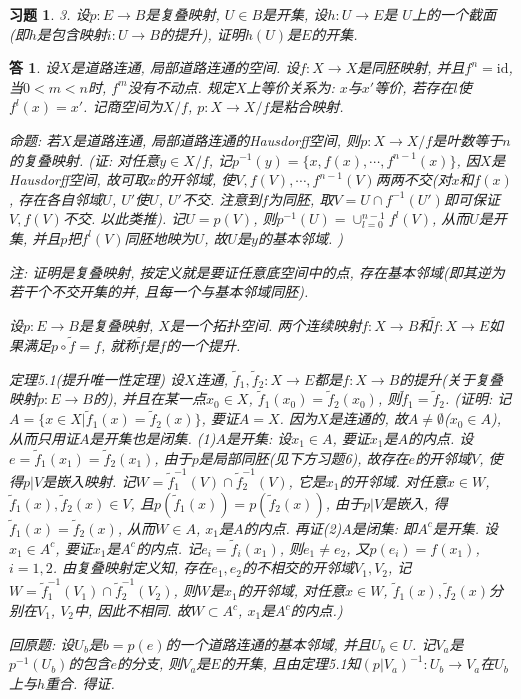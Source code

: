 \documentclass{ctexart}%
\newtheorem*{exercise}{习题}
\newtheorem*{solution}{答}
\theoremstyle{definition}
\theoremstyle{remark}
\begin{document}
\begin{exercise}3. 设$p:E\rightarrow B$是复叠映射, $U\in B$是开集, 设$h:U\rightarrow E$是 $U$上的一个截面(即$h$是包含映射$i:U\rightarrow B$的提升), 证明$h(U)$是$E$的开集. 
\end{exercise}
\begin{solution}
设$X$是道路连通, 局部道路连通的空间. 设$f:X\rightarrow X$是同胚映射, 并且$f^n=\text{id}$, 当$0<m<n$时, $f^m$没有不动点. 规定$X$上等价关系为: $x$与$x'$等价, 若存在$l$使$f^l(x)=x'$. 记商空间为$X/f$, $p:X\rightarrow X/f$是粘合映射. 

命题: 若$X$是道路连通, 局部道路连通的Hausdorff空间, 则$p:X\rightarrow X/f$是叶数等于$n$的复叠映射. (证: 对任意$y\in X/f$, 记$p^{-1}(y)=\{x,f(x),\cdots, f^{n-1}(x)\}$, 因$X$是Hausdorff空间, 故可取$x$的开邻域, 使$V,f(V),\cdots, f^{n-1}(V)$两两不交(对$x$和$f(x)$, 存在各自邻域$U$, $U'$使$U$, $U'$不交. 注意到$f$为同胚, 取$V=U\cap f^{-1}(U')$即可保证$V, f(V)$不交. 以此类推). 记$U=p(V)$, 则$p^{-1}(U)=\cup^{n-1}_{l=0}f^l(V)$, 从而$U$是开集, 并且$p$把$f^l(V)$同胚地映为$U$, 故$U$是$y$的基本邻域. )

注: 证明是复叠映射, 按定义就是要证任意底空间中的点, 存在基本邻域(即其逆为若干个不交开集的并, 且每一个与基本邻域同胚).


设$p:E\rightarrow B$是复叠映射, $X$是一个拓扑空间. 两个连续映射$f:X\rightarrow B$和$\tilde{f}:X\rightarrow E$如果满足$p\circ \tilde{f}= f$, 就称$\tilde{f}$是$f$的一个提升. 

定理5.1(提升唯一性定理) 设$X$连通, $\tilde{f}_1,\tilde{f}_2:X\rightarrow E$都是$f:X\rightarrow B$的提升(关于复叠映射$p:E\rightarrow B$的), 并且在某一点$x_0\in X$, $\tilde{f}_1(x_0)=\tilde{f}_2(x_0)$, 则$\tilde{f}_1=\tilde{f}_2$.  (证明: 记$A=\{x\in X|\tilde{f}_1(x)=\tilde{f}_2(x)\}$, 要证$A=X$. 因为$X$是连通的, 故$A\neq \emptyset$($x_0\in A$), 从而只用证$A$是开集也是闭集. (1)$A$是开集: 设$x_1\in A$, 要证$x_1$是$A$的内点. 设$e=\tilde{f}_1(x_1)=\tilde{f}_2(x_1)$, 由于$p$是局部同胚(见下方习题6), 故存在$e$的开邻域$V$, 使得$p|V$是嵌入映射. 记$W=\tilde{f}_1^{-1}(V)\cap\tilde{f}_2^{-1}(V)$, 它是$x_1$的开邻域. 对任意$x\in W$, $\tilde{f}_1(x),\tilde{f}_2(x)\in V$, 且$p(\tilde{f}_1(x))=p(\tilde{f}_2(x))$, 由于$p|V$是嵌入, 得$\tilde{f}_1(x)=\tilde{f}_2(x)$, 从而$W\in A$, $x_1$是$A$的内点. 再证(2)$A$是闭集: 即$A^c$是开集. 设$x_1\in A^c$, 要证$x_1$是$A^c$的内点. 记$e_i=\tilde{f}_i(x_1)$, 则$e_1\neq e_2$, 又$p(e_i)=f(x_1)$, $i=1,2$. 由复叠映射定义知, 存在$e_1,e_2$的不相交的开邻域$V_1,V_2$, 记$W=\tilde{f}_1^{-1}(V_1)\cap \tilde{f}_2^{-1}(V_2)$, 则$W$是$x_1$的开邻域, 对任意$x\in W$, $\tilde{f}_1(x), \tilde{f}_2(x)$分别在$V_1$, $V_2$中, 因此不相同. 故$W\subset A^c$, $x_1$是$A^c$的内点.)

回原题: 设$U_b$是$b=p(e)$的一个道路连通的基本邻域, 并且$U_b\in U$. 记$V_a$是$p^{-1}(U_b)$的包含$e$的分支, 则$V_a$是$E$的开集, 且由定理5.1知$(p|V_a)^{-1}:U_b\rightarrow V_a$在$U_b$上与$h$重合. 得证.
\end{solution}
\end{document}
